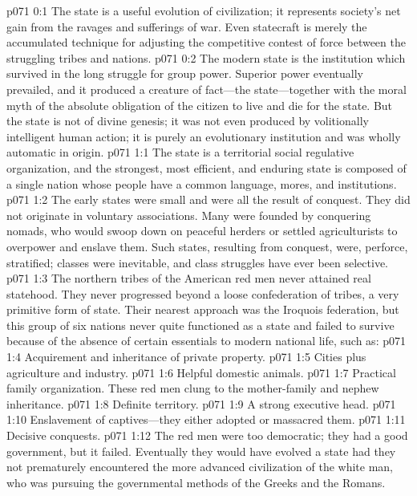 \author{Melchizedek}
\vs p071 0:1 The state is a useful evolution of civilization; it represents society’s net gain from the ravages and sufferings of war. Even statecraft is merely the accumulated technique for adjusting the competitive contest of force between the struggling tribes and nations.
\vs p071 0:2 The modern state is the institution which survived in the long struggle for group power. Superior power eventually prevailed, and it produced a creature of fact---the state---together with the moral myth of the absolute obligation of the citizen to live and die for the state. But the state is not of divine genesis; it was not even produced by volitionally intelligent human action; it is purely an evolutionary institution and was wholly automatic in origin.\plusone
{}
\vs p071 1:1 The state is a territorial social regulative organization, and the strongest, most efficient, and enduring state is composed of a single nation whose people have a common language, mores, and institutions.
\vs p071 1:2 The early states were small and were all the result of conquest. They did not originate in voluntary associations. Many were founded by conquering nomads, who would swoop down on peaceful herders or settled agriculturists to overpower and enslave them. Such states, resulting from conquest, were, perforce, stratified; classes were inevitable, and class struggles have ever been selective.
\pc \vs p071 1:3 The northern tribes of the American red men never attained real statehood. They never progressed beyond a loose confederation of tribes, a very primitive form of state. Their nearest approach was the Iroquois federation, but this group of six nations never quite functioned as a state and failed to survive because of the absence of certain essentials to modern national life, such as:
\pc \vs p071 1:4 \bibnobreakspace Acquirement and inheritance of private property.
\vs p071 1:5 \bibnobreakspace Cities plus agriculture and industry.
\vs p071 1:6 \bibnobreakspace Helpful domestic animals.
\vs p071 1:7 \bibnobreakspace Practical family organization. These red men clung to the mother\hyp{}family and nephew inheritance.
\vs p071 1:8 \bibnobreakspace Definite territory.
\vs p071 1:9 \bibnobreakspace A strong executive head.
\vs p071 1:10 \bibnobreakspace Enslavement of captives---they either adopted or massacred them.
\vs p071 1:11 \bibnobreakspace Decisive conquests.
\pc \vs p071 1:12 The red men were too democratic; they had a good government, but it failed. Eventually they would have evolved a state had they not prematurely encountered the more advanced civilization of the white man, who was pursuing the governmental methods of the Greeks and the Romans.

